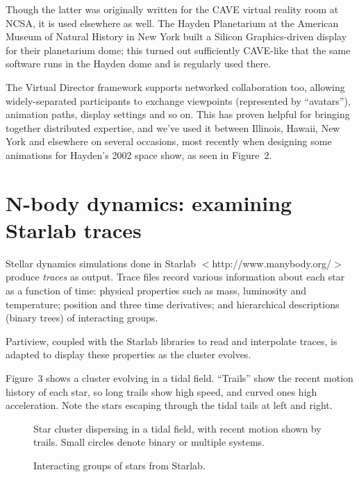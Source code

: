 Though the latter was originally written for the
CAVE virtual reality room at NCSA, it is used elsewhere as well.
The Hayden Planetarium at the American Museum of Natural History
in New York built a Silicon Graphics-driven display for their
planetarium dome; this turned out sufficiently
CAVE-like that the same software runs in the Hayden dome and is
regularly used there.

The Virtual Director framework supports networked collaboration too,
allowing widely-separated participants to exchange viewpoints
(represented by ``avatars''), animation paths, display settings
and so on.  This has proven helpful for bringing together distributed
expertise, and we've used it between Illinois, Hawaii, New York
and elsewhere on several occasions, most recently when designing
some animations for Hayden's 2002 space show, as seen in Figure~2.


\section{N-body dynamics: examining Starlab traces}

Stellar dynamics simulations done in Starlab $<$http://www.manybody.org/$>$
produce {\it traces} as output.  Trace files record various information
about each star as a function of time: physical properties such as mass,
luminosity and temperature; position and three time derivatives;
and hierarchical descriptions (binary trees) of interacting groups.

Partiview, coupled with the Starlab libraries to read and interpolate
traces, is adapted to display these properties as the cluster evolves.

Figure~3 shows a cluster evolving in a tidal field.
``Trails'' show the recent motion
history of each star, so long trails show high speed, and curved ones
high acceleration.  Note the stars escaping through the tidal tails
at left and right.

\begin{figure}
  \caption{Star cluster dispersing in a tidal field,
    with recent motion shown by trails.  Small circles denote binary or
    multiple systems.}
\end{figure}

\begin{figure}
  \caption{Interacting groups of stars from Starlab.}
\end{figure}

